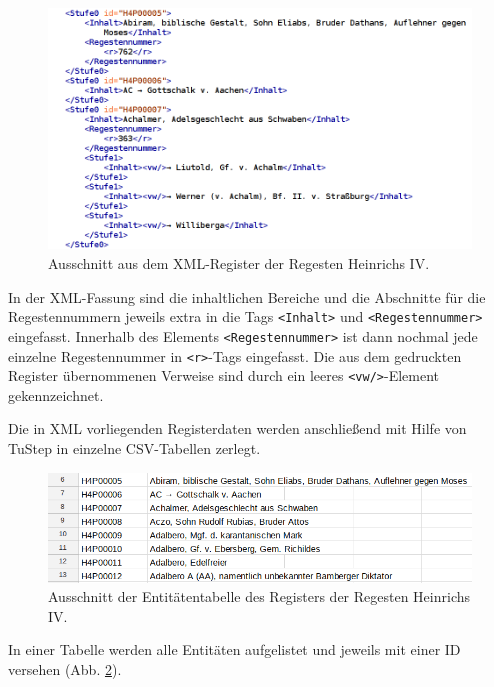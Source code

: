 \documentclass[ngerman,]{scrreprt}
\begin{document}
\begin{figure}
\centering
\includegraphics{Bilder/RI2Graph/XML-Register.png}
\caption{Ausschnitt aus dem XML-Register der Regesten Heinrichs IV.}
\label{ausschnittxml}
\end{figure}

In der XML-Fassung sind die inhaltlichen Bereiche und die Abschnitte für die Regestennummern jeweils extra in die Tags \texttt{\textless{}Inhalt\textgreater{}} und \texttt{\textless{}Regestennummer\textgreater{}} eingefasst. Innerhalb des Elements \texttt{\textless{}Regestennummer\textgreater{}} ist dann nochmal jede einzelne Regestennummer in \texttt{\textless{}r\textgreater{}}-Tags eingefasst. Die aus dem gedruckten Register übernommenen Verweise sind durch ein leeres \texttt{\textless{}vw/\textgreater{}}-Element gekennzeichnet.

Die in XML vorliegenden Registerdaten werden anschließend mit Hilfe von TuStep in einzelne CSV-Tabellen zerlegt.

\begin{figure}
\centering
\includegraphics{Bilder/RI2Graph/RegisterH4-Tabelle-Entitaeten.png}
\caption{Ausschnitt der Entitätentabelle des Registers der Regesten Heinrichs IV.}
\label{entitaeten}
\end{figure}

In einer Tabelle werden alle Entitäten aufgelistet und jeweils mit einer ID versehen (Abb. \ref{entitaeten}).
\end{document}
